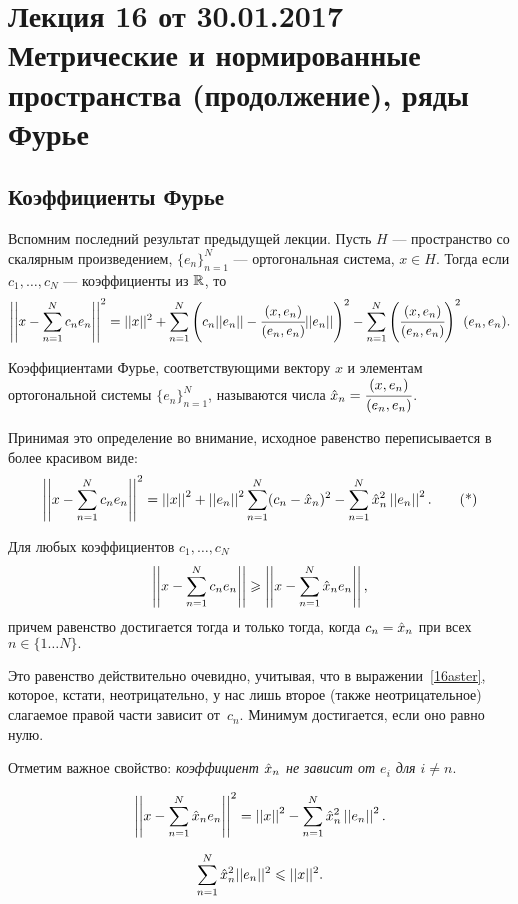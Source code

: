 \section{Лекция 16 от 30.01.2017 \\ Метрические и нормированные пространства (продолжение), ряды Фурье}
\subsection{Коэффициенты Фурье}
Вспомним последний результат предыдущей лекции. Пусть $H$ --- пространство со скалярным произведением, $\{e_n\}_{n=1}^{N}$ --- ортогональная система, $x \in H$. Тогда если $c_1, \ldots, c_N$ --- коэффициенты из $\mathbb{R}$, то 
\begin{gather*}
    \left|\left|x - \sum\limits_{n= 1}^{N}c_ne_n\right|\right|^2 = ||x||^2 +\sum\limits_{n=1}^{N}\left(c_n||e_n|| - \cfrac{(x, e_n)}{(e_n, e_n)}||e_n||\right)^2 - \sum\limits_{n =1 }^{N} \left(\cfrac{(x, e_n)}{(e_n, e_n)}\right)^2(e_n, e_n).
\end{gather*}
\begin{Def}
    Коэффициентами Фурье, соответствующими вектору $x$ и элементам ортогональной системы $\{e_n\}_{n=1}^{N}$, называются числа $\hat{x}_n = \cfrac{(x, e_n)}{(e_n, e_n)}$.
\end{Def}
Принимая это определение во внимание, исходное равенство переписывается в более красивом виде:
\[
    \left|\left|x - \sum\limits_{n= 1}^{N}c_ne_n\right|\right|^2 = \left|\left|x\right|\right|^2 + \left|\left|e_n\right|\right|^2 \sum\limits_{n=1}^{N}(c_n - \hat{x}_n)^2 - \sum\limits_{n =1}^{N}\hat{x}_n^2 
    \left|\left|e_n\right|\right|^2. \tag{*}\label{16aster}
\]
\begin{Statement}[очевидное]
    Для любых коэффициентов $c_1, \ldots, c_N$
    $$
        \left|\left| x - \sum\limits_{n=1}^{N}c_n e_n\right|\right|\geqslant \left|\left|x -  \sum\limits_{n=1}^{N}\hat{x}_n e_n\right|\right|,
    $$
    причем равенство достигается тогда и только тогда, когда $c_n = \hat{x}_n$ при всех $n\in \{1\dots N\}.$
\end{Statement}
Это равенство действительно очевидно, учитывая, что в выражении~\eqref{16aster}, которое, кстати, неотрицательно, у нас лишь второе (также неотрицательное) слагаемое правой части зависит от~$c_n$. Минимум достигается, если оно равно нулю.

Отметим важное свойство: \textit{коэффициент $\hat{x}_n$ не зависит от $e_i$ для $i \neq n$}.
\begin{Statement}
    $$
        \left|\left|x - \sum\limits_{n=1}^{N}\hat{x}_ne_n\right|\right|^2 = \left|\left|x\right|\right|^2 - \sum\limits_{n=1}^{N} \hat{x}_n^2 \left|\left|e_n\right|\right|^2.
    $$
\end{Statement}
\begin{Consequence}
    $$\sum\limits_{n=1}^{N} \hat{x}_n^2||e_n||^2\leqslant ||x||^2.$$
\end{Consequence}

